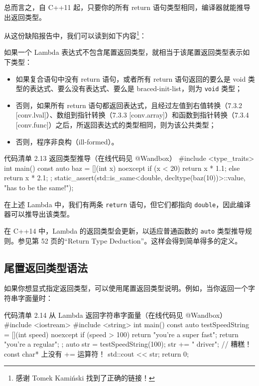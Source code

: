 \begin{codebox}
总而言之，自 C++11 起，只要你的所有 return 语句类型相同，编译器就能推导出返回类型。

从这份缺陷报告中，我们可以读到如下内容\footnote{感谢 Tomek Kamiński 找到了正确的链接！}：

如果一个 Lambda 表达式不包含尾置返回类型，就相当于该尾置返回类型表示如下类型：

\begin{itemize}
\item 如果复合语句中没有 return 语句，或者所有 return 语句返回的要么是 void 类型的表达式、要么没有表达式、要么是 braced-init-list，则为 \texttt{void} 类型；
\item 否则，如果所有 return 语句都返回表达式，且经过左值到右值转换（7.3.2 [conv.lval]）、数组到指针转换（7.3.3 [conv.array]）和函数到指针转换（7.3.4 [conv.func]）之后，所返回表达式的类型相同，则为该公共类型；
\item 否则，程序非良构（ill-formed）。
\end{itemize}

\begin{codeboxt}{代码清单 2.13 返回类型推导（在线代码见 @Wandbox）}
#include <type_traits>
int main() {
const auto baz = [](int x) noexcept {
if (x < 20)
return x * 1.1;
else
return x * 2.1;
};
static_assert(std::is_same<double, decltype(baz(10))>::value,
"has to be the same!");
}
\end{codeboxt}

在上述 Lambda 中，我们有两条 \texttt{return} 语句，但它们都指向 \texttt{double}，因此编译器可以推导出该类型。


在 C++14 中，Lambda 的返回类型会更新，以适应普通函数的 \texttt{auto} 类型推导规则。参见第 52 页的“Return Type Deduction”。这样会得到简单得多的定义。

\subsection{尾置返回类型语法}

如果你想显式指定返回类型，可以使用尾置返回类型说明。例如，当你返回一个字符串字面量时：

\begin{codeboxt}{代码清单 2.14 从 Lambda 返回字符串字面量（在线代码见 @Wandbox）}
#include <iostream>
#include <string>
int main() {
const auto testSpeedString = [](int speed) noexcept {
if (speed > 100)
return "you're a super fast";
return "you're a regular";
};
auto str = testSpeedString(100);
str += " driver";
// 糟糕！const char* 上没有 += 运算符！
std::cout << str;
return 0;
}
\end{codeboxt}


\end{codebox}
